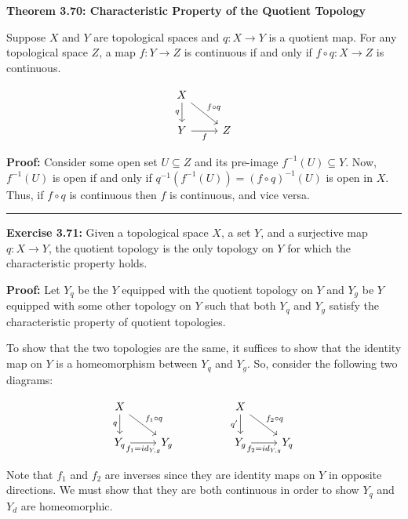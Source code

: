 \documentclass{article}
\begin{document}
\textbf{Theorem 3.70: Characteristic Property of the Quotient Topology} 

Suppose $X$ and $Y$ are topological spaces and $q : X \rightarrow Y$ is a quotient map. For any topological space $Z$, a map $f : Y \rightarrow Z$ is continuous if and only if $f \circ q : X \rightarrow Z$ is continuous.

\[\begin{tikzcd}
	X \\
	Y & Z
	\arrow["q"', from=1-1, to=2-1]
	\arrow["f"', from=2-1, to=2-2]
	\arrow["{f \circ q}", from=1-1, to=2-2]
\end{tikzcd}\]

\vskip 0.5cm

\textbf{Proof:} Consider some open set $U \subseteq Z$ and its pre-image $f^{-1}(U) \subseteq Y$. Now, $f^{-1}(U)$ is open if and only if $q^{-1}(f^{-1}(U)) = (f \circ q)^{-1}(U)$ is open in $X$. Thus, if $f \circ q$ is continuous then $f$ is continuous, and vice versa.

\vskip 0.5cm
\hrule
\vskip 0.5cm

\textbf{Exercise 3.71:} Given a topological space $X$, a set $Y$, and a surjective map $q : X \rightarrow Y$, the quotient topology is the only topology on $Y$ for which the characteristic property holds.

\vskip 0.5cm

\textbf{Proof:} Let $Y_q$ be the $Y$ equipped with the quotient topology on $Y$ and $Y_g$ be $Y$ equipped with some other topology on $Y$ such that both $Y_q$ and $Y_g$ satisfy the characteristic property of quotient topologies. 

\vskip 0.5cm
To show that the two topologies are the same, it suffices to show that the identity map on $Y$ is a homeomorphism between $Y_q$ and $Y_g$. So, consider the following two diagrams:

\[\begin{tikzcd}
	X &&& X \\
	{Y_q} & {Y_g} && {Y_g} & {Y_q}
	\arrow["q"', from=1-1, to=2-1]
	\arrow["{f_1 = id_{Y,g}}"', from=2-1, to=2-2]
	\arrow["{f_1 \circ q}", from=1-1, to=2-2]
	\arrow["{q'}"', from=1-4, to=2-4]
	\arrow["{f_2 = id_{Y,q}}"', from=2-4, to=2-5]
	\arrow["{f_2 \circ q}", from=1-4, to=2-5]
\end{tikzcd}\]

Note that $f_1$ and $f_2$ are inverses since they are identity maps on $Y$ in opposite directions. We must show that they are both continuous in order to show $Y_q$ and $Y_d$ are homeomorphic.
\end{document}
